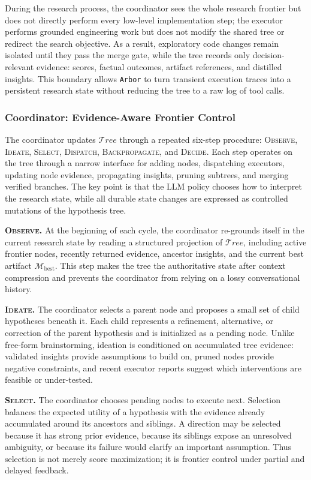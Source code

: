 \documentclass{llmxive}
\providecommand{\arbor}{\texttt{Arbor}}
\providecommand{\Mat}{\mathcal{M}}
\providecommand{\Tree}{\mathcal{T}\!\textit{ree}}
\begin{document}
During the research process, the coordinator sees the whole research
frontier but does not directly perform every low-level implementation step; the
executor performs grounded engineering work but does not modify the shared tree
or redirect the search objective. As a result, exploratory code changes remain
isolated until they pass the merge gate, while the tree records only
decision-relevant evidence: scores, factual outcomes, artifact references, and
distilled insights. This boundary allows \arbor{} to turn transient execution
traces into a persistent research state without reducing the tree to a raw log
of tool calls.

\subsubsection{Coordinator: Evidence-Aware Frontier Control}
\label{sec:framework-loop-policy}
The coordinator updates $\Tree$ through a repeated six-step procedure:
\textsc{Observe}, \textsc{Ideate}, \textsc{Select}, \textsc{Dispatch},
\textsc{Backpropagate}, and \textsc{Decide}. Each step operates on the tree
through a narrow interface for adding nodes, dispatching executors, updating
node evidence, propagating insights, pruning subtrees, and merging verified
branches. The key point is that the LLM policy chooses how to interpret the
research state, while all durable state changes are expressed as controlled
mutations of the hypothesis tree.

\textbf{\textsc{Observe}.}
At the beginning of each cycle, the coordinator re-grounds itself in the current
research state by reading a structured projection of $\Tree$, including active
frontier nodes, recently returned evidence, ancestor insights, and the current
best artifact $\Mat_{\mathrm{best}}$. This step makes the tree the authoritative
state after context compression and prevents the coordinator from relying on a
lossy conversational history.

\textbf{\textsc{Ideate}.}
The coordinator selects a parent node and proposes a small set of child
hypotheses beneath it. Each child represents a refinement, alternative, or
correction of the parent hypothesis and is initialized as a pending node. Unlike
free-form brainstorming, ideation is conditioned on accumulated tree evidence:
validated insights provide assumptions to build on, pruned nodes provide
negative constraints, and recent executor reports suggest which interventions
are feasible or under-tested.

\textbf{\textsc{Select}.}
The coordinator chooses pending nodes to execute next. Selection balances the
expected utility of a hypothesis with the evidence already accumulated around
its ancestors and siblings. A direction may be selected because it has strong
prior evidence, because its siblings expose an unresolved ambiguity, or because
its failure would clarify an important assumption. Thus selection is not merely
score maximization; it is frontier control under partial and delayed feedback.
\end{document}
